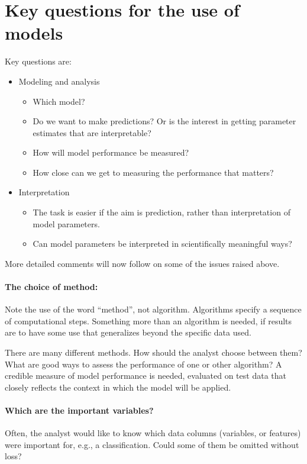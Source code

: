 \documentclass{tufte-book}\usepackage[]{graphicx}\usepackage[]{color}
\begin{document}
 \section{Key questions for the use of models}

Key questions are:
\begin{itemize}
\item Modeling and analysis
  \begin{itemize}
    \item Which model?
    \item Do we want to make predictions?  Or is the interest in getting
parameter estimates that are interpretable?
    \item How will model performance be measured?
    \item How close can we get to measuring the performance that matters?
  \end{itemize}
\item Interpretation
  \begin{itemize}
    \item The task is easier if the aim is prediction, rather than
interpretation of model parameters.
    \item Can model parameters be interpreted in scientifically meaningful
      ways?
  \end{itemize}
\end{itemize}

More detailed comments will now follow on some of the issues raised above.

\paragraph{The choice of  method:} Note the use of the word ``method'',
not algorithm. Algorithms specify a sequence of computational steps.
Something more than an algorithm is needed, if results are to have
some use that generalizes beyond the specific data used.

There are many different methods. How should the analyst
choose between them?  What are good ways to assess the performance of
one or other algorithm? A credible measure of model performance is
needed, evaluated on test data that closely reflects the context in
which the model will be applied.

\paragraph{Which are the important variables?} Often, the analyst
would like to know which data columns (variables, or features) were
important for, e.g., a classification.  Could some of them be omitted
without loss?
\end{document}
